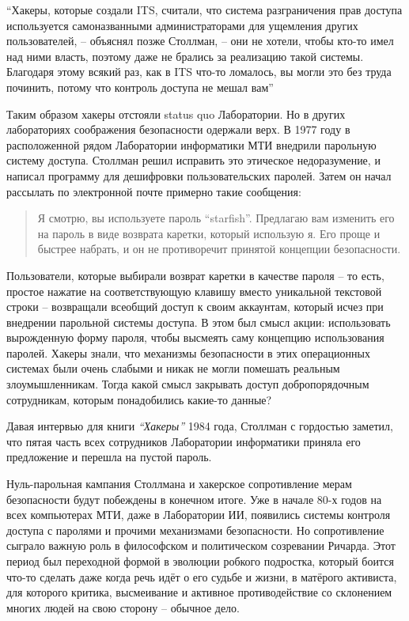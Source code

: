 \enquote{Хакеры, которые создали ITS, считали, что система разграничения прав доступа используется самоназванными администраторами для ущемления других пользователей, -- объяснял позже Столлман, -- они не хотели, чтобы кто-то имел над ними власть, поэтому даже не брались за реализацию такой системы. Благодаря этому всякий раз, как в ITS что-то ломалось, вы могли это без труда починить, потому что контроль доступа не мешал вам}

Таким образом хакеры отстояли status quo Лаборатории. Но в других лабораториях соображения безопасности одержали верх. В 1977 году в расположенной рядом Лаборатории информатики МТИ внедрили парольную систему доступа. Столлман решил исправить это этическое недоразумение, и написал программу для дешифровки пользовательских паролей. Затем он начал рассылать по электронной почте примерно такие сообщения:

\begin{quote}
Я смотрю, вы используете пароль \enquote{starfish}. Предлагаю вам изменить его на пароль в виде возврата каретки, который использую я. Его проще и быстрее набрать, и он не противоречит принятой концепции безопасности.
\end{quote}

Пользователи, которые выбирали возврат каретки в качестве пароля -- то есть, простое нажатие на соответствующую клавишу вместо уникальной текстовой строки -- возвращали всеобщий доступ к своим аккаунтам, который исчез при внедрении парольной системы доступа. В этом был смысл акции: использовать вырожденную форму пароля, чтобы высмеять саму концепцию использования паролей. Хакеры знали, что механизмы безопасности в этих операционных системах были очень слабыми и никак не могли помешать реальным злоумышленникам. Тогда какой смысл закрывать доступ добропорядочным сотрудникам, которым понадобились какие-то данные?

Давая интервью для книги \textit{\enquote{Хакеры}} 1984 года, Столлман с гордостью заметил, что пятая часть всех сотрудников Лаборатории информатики приняла его предложение и перешла на пустой пароль.

Нуль-парольная кампания Столлмана и хакерское сопротивление мерам безопасности будут побеждены в конечном итоге. Уже в начале 80-х годов на всех компьютерах МТИ, даже в Лаборатории ИИ, появились системы контроля доступа с паролями и прочими механизмами безопасности. Но сопротивление сыграло важную роль в философском и политическом созревании Ричарда. Этот период был переходной формой в эволюции робкого подростка, который боится что-то сделать даже когда речь идёт о его судьбе и жизни, в матёрого активиста, для которого критика, высмеивание и активное противодействие со склонением многих людей на свою сторону -- обычное дело.

